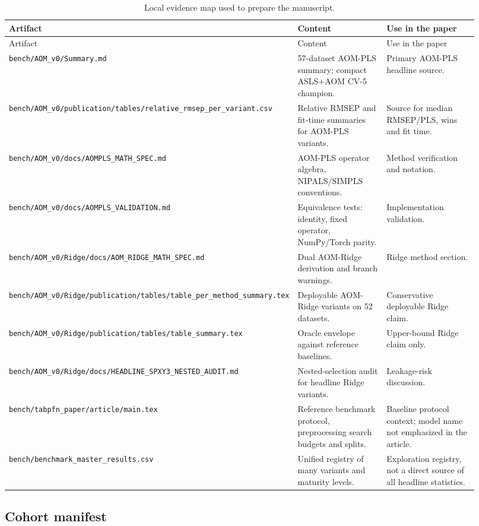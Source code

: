 \documentclass[11pt,a4paper]{article}
\newcommand{\code}[1]{\nolinkurl{#1}}
\begin{document}
\begin{longtable}{L{0.28\linewidth}L{0.29\linewidth}L{0.35\linewidth}}
\caption{Local evidence map used to prepare the manuscript.}\\
\toprule
Artifact & Content & Use in the paper \\
\midrule
\endfirsthead
\toprule
Artifact & Content & Use in the paper \\
\midrule
\endhead
\code{bench/AOM_v0/Summary.md} &
57-dataset AOM-PLS summary; compact ASLS+AOM CV-5 champion. &
Primary AOM-PLS headline source.\\
\code{bench/AOM_v0/publication/tables/relative_rmsep_per_variant.csv} &
Relative RMSEP and fit-time summaries for AOM-PLS variants. &
Source for median RMSEP/PLS, wins and fit time.\\
\code{bench/AOM_v0/docs/AOMPLS_MATH_SPEC.md} &
AOM-PLS operator algebra, NIPALS/SIMPLS conventions. &
Method verification and notation.\\
\code{bench/AOM_v0/docs/AOMPLS_VALIDATION.md} &
Equivalence tests: identity, fixed operator, NumPy/Torch parity. &
Implementation validation.\\
\code{bench/AOM_v0/Ridge/docs/AOM_RIDGE_MATH_SPEC.md} &
Dual AOM-Ridge derivation and branch warnings. &
Ridge method section.\\
\code{bench/AOM_v0/Ridge/publication/tables/table_per_method_summary.tex} &
Deployable AOM-Ridge variants on 52 datasets. &
Conservative deployable Ridge claim.\\
\code{bench/AOM_v0/Ridge/publication/tables/table_summary.tex} &
Oracle envelope against reference baselines. &
Upper-bound Ridge claim only.\\
\code{bench/AOM_v0/Ridge/docs/HEADLINE_SPXY3_NESTED_AUDIT.md} &
Nested-selection audit for headline Ridge variants. &
Leakage-risk discussion.\\
\code{bench/tabpfn_paper/article/main.tex} &
Reference benchmark protocol, preprocessing search budgets and splits. &
Baseline protocol context; model name not emphasized in the article.\\
\code{bench/benchmark_master_results.csv} &
Unified registry of many variants and maturity levels. &
Exploration registry, not a direct source of all headline statistics.\\
\bottomrule
\end{longtable}

\subsection{Cohort manifest}
\end{document}
